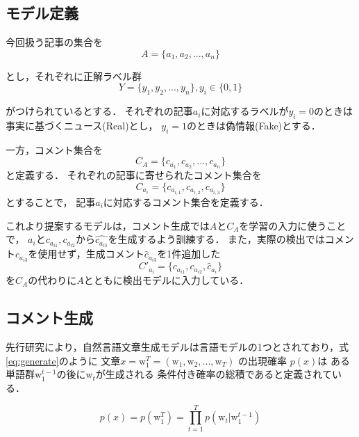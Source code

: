 \subsection{モデル定義}
今回扱う記事の集合を 
\begin{equation}
    A = \{a_1, a_2, ..., a_n\}
\end{equation}

とし，それぞれに正解ラベル群 
\begin{equation}
    Y=\{y_1, y_2, ..., y_n\}, y_i \in \{0, 1\}
\end{equation}

がつけられているとする．
それぞれの記事$a_i$に対応するラベルが$y_i=0$のときは事実に基づくニュース(Real)とし，
$y_i=1$のときは偽情報(Fake)とする．

一方，コメント集合を
\begin{equation}
    C_A = \{c_{a_1}, c_{a_2}, ..., c_{a_n}\}
\end{equation}
と定義する．
それぞれの記事に寄せられたコメント集合を
\begin{equation}
    C_{a_i} = \{c_{a_{i,1}}, c_{a_{i,2}}, c_{a_{i,3}}\}
\end{equation}
とすることで，
記事$a_i$に対応するコメント集合を定義する．

これより提案するモデルは，コメント生成では$A$と$C_A$を学習の入力に使うことで，
$a_i$と$c_{a_{i1}}, c_{a_{i2}}$から$\hat{c_{a_{i3}}}$を生成するよう訓練する．
また，実際の検出ではコメント$c_{a_{i3}}$を使用せず，生成コメント$\hat{c}_{a_{i3}}$を1件追加した
\begin{equation}
    C'_{a_i} = \{ c_{a_{i1}}, c_{a_{i2}}, \hat{c}_{a_{i}}\}
\end{equation}
を$C_A$の代わりに$A$とともに検出モデルに入力している．


\subsection{コメント生成}
\label{sec:method_generate}
先行研究により，自然言語文章生成モデルは言語モデルの1つとされており，式\ref{eq:generate}のように
文章$x = \mathrm{w}_1^T = (\mathrm{w}_1, \mathrm{w}_2, ..., \mathrm{w}_T)$
の出現確率 $p(x)$は
ある単語群$ \mathrm{w}_1^{t-1}$の後に$\mathrm{w}_t$が生成される
条件付き確率の総積であると定義されている．

\begin{equation}
    \label{eq:generate}
    p(x) = p(\mathrm{w}_1^T) = \prod_{t=1}^{T} p(\mathrm{w}_t|\mathrm{w}_1^{t-1})
\end{equation}

